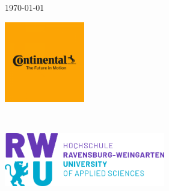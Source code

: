 \documentclass[a4paper,11pt,singlespacing]{article}
\begin{document}
\begin{titlepage}
	
	
	{\large \today}\\[3cm] %
	
	
	\begin{minipage}{0.4\textwidth}
		\begin{flushleft} \large
			\includegraphics[width=3.5cm]{images/conti_logo.png} %
		\end{flushleft}
	\end{minipage}
	~
	\begin{minipage}{0.5\textwidth}
		\begin{flushright} \large
			\includegraphics[width=7cm]{images/logo.png} %
		\end{flushright}
	\end{minipage}\\[2cm]

	
	\vfill %
	
\end{titlepage}

\tableofcontents
\pagebreak






\printbibliography[heading=bibintoc]
\end{document}
